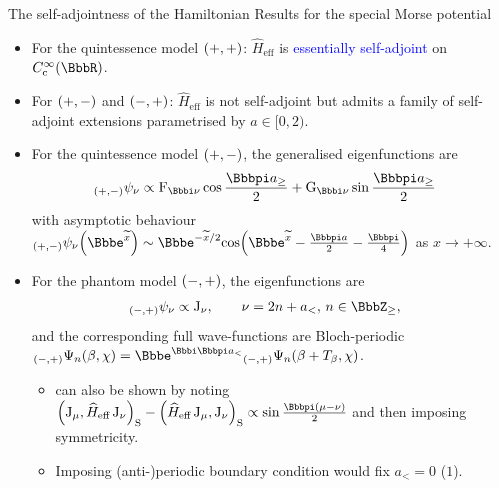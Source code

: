 \documentclass[8pt]{beamer}
\begin{document}
\begin{frame}%
{The self-adjointness of the Hamiltonian}%
{Results for the special Morse potential }
\begin{itemize}
\item For the quintessence model ${\left(+, +\right)}$: $\widehat{H}_\text{eff}$ is
\textcolor{blue}{essentially self-adjoint} on
$\rfun{C_\text{c}^{\infty}}{\BbbR}$.

\item For ${\left(+, -\right)}$ and ${\left(-, +\right)}$:
$\widehat{H}_\text{eff}$ is \alert{not self-adjoint} but admits a family of
self-adjoint extensions parametrised by $a \in [0,2)$.

\item For the quintessence model ${\left(+,-\right)}$, the generalised eigenfunctions are
\begin{align}
{}_{\rbr{+,-}}\psi_\nu &\propto \BesselF_{\ii\nu}\cos\frac{\pp a_\ge}{2}
+ \BesselG_{\ii\nu}\sin\frac{\pp a_\ge}{2}
\end{align}
with asymptotic behaviour $\rfun{{}_{\rbr{+,-}}\psi_\nu}{\ee^{\widetilde{x}}}
\sim \ee^{-\widetilde{x}/2}
\rfun{\cos}{\ee^{\widetilde{x}}-\frac{\pp a}{2}-\frac{\pp}{4}}$
as $x \to +\infty$.

\item For the phantom model ${\left(-, +\right)}$, the eigenfunctions are
\begin{align}
{}_{\rbr{-,+}}\psi_{\nu} &\propto \BesselJ_{\nu},\qquad \nu = 2n+a_<,\, n \in
\BbbZ_\ge,
\label{eq:Phi_nu}
\end{align}
and the corresponding full wave-functions are Bloch-periodic
$\rfun{{}_{\rbr{-,+}}\Psi_{n}}{\beta,\chi} = \ee^{\ii\pp a_<}
\rfun{{}_{\rbr{-,+}}\Psi_{n}}{\beta + T_\beta,\chi}$.

\begin{itemize}
\item {} can also be shown by noting
$\rbr{\BesselJ_{\mu}, \widehat{H}_{\text{eff}} \BesselJ_{\nu}}_\text{S} - 
\rbr{\widehat{H}_{\text{eff}} \BesselJ_{\mu}, \BesselJ_{\nu}}_\text{S} \propto
\sin \frac{\pp\rbr{\mu-\nu}}{2}$
and then imposing symmetricity.

\item Imposing (anti-)periodic boundary condition would fix $a_< = 0$ ($1$).
\end{itemize}

\end{itemize}

\end{frame}
\end{document}
